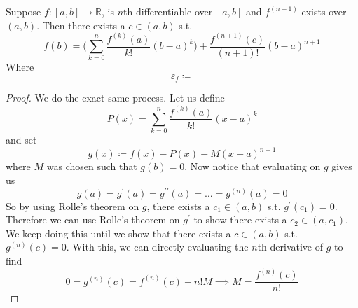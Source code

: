   \begin{theorem}
    Suppose $f: [a, b] \to \mathbb{R}$, is $n$th differentiable over $[a, b]$ and $f^{(n+1)}$ exists over $(a, b)$. Then there exists a $c \in (a, b)$ s.t. 
    \begin{equation}
      f(b) = \bigg( \sum_{k=0}^n \frac{f^{(k)}(a)}{k!} (b - a)^k  \bigg) + \frac{f^{(n+1)} (c)}{(n+1)!} (b - a)^{n+1}
    \end{equation} 
    Where 
    \begin{equation}
      \varepsilon_f \coloneqq 
    \end{equation}
  \end{theorem}
  \begin{proof}
    We do the exact same process. Let us define 
    \begin{equation}
      P(x) = \sum_{k=0}^n \frac{f^{(k)} (a)}{k!} (x - a)^k
    \end{equation} 
    and set 
    \begin{equation}
      g(x) \coloneqq f(x) - P(x) - M (x - a)^{n+1}
    \end{equation} 
    where $M$ was chosen such that $g(b) = 0$. Now notice that evaluating on $g$ gives us 
    \begin{equation}
      g(a) = g^\prime (a) = g^{\prime\prime} (a) = \ldots = g^{(n)} (a) = 0 
    \end{equation} 
    So by using Rolle's theorem on $g$, there exists a $c_1 \in (a, b)$ s.t. $g^\prime (c_1) = 0$. Therefore we can use Rolle's theorem on $g^\prime$ to show there exists a $c_2 \in (a, c_1)$. We keep doing this until we show that there exists a $c \in (a, b)$ s.t. $g^{(n)} (c) = 0$. With this, we can directly evaluating the $n$th derivative of $g$ to find 
    \begin{equation}
      0 = g^{(n)} (c) = f^{(n)} (c) - n! M \implies M = \frac{f^{(n)} (c)}{n!}
    \end{equation}
  \end{proof}

